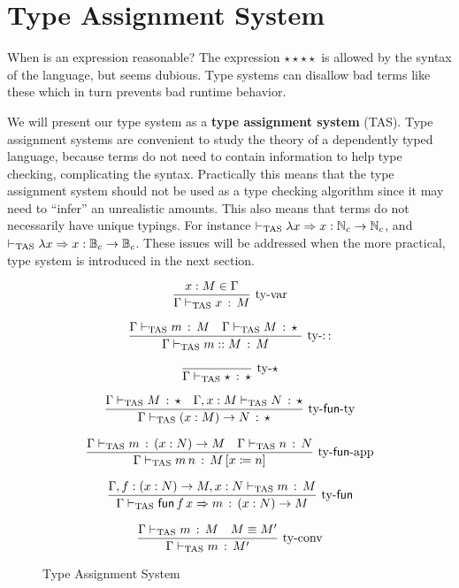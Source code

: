 \section{\SLang{} Type Assignment System}
 
When is an expression reasonable? The expression $\star\star\star\star$ is allowed by the syntax of the language, but seems dubious.
Type systems can disallow bad terms like these which in turn prevents bad runtime behavior.
 
We will present our type system as a \textbf{type assignment system} (\ac{TAS}).
Type assignment systems are convenient to study the theory of a dependently typed language, because terms do not need to contain information to help type checking, complicating the syntax. %
Practically this means that the type assignment system should not be used as a type checking algorithm since it may need to ``infer'' an unrealistic amounts.
This also means that terms do not necessarily have unique typings.
For instance $\vdash_{\mathrm{TAS}}\lambda x\Rightarrow x:\mathbb{N}_{c}\rightarrow\mathbb{N}_{c}$, and $\vdash_{\mathrm{TAS}}\lambda x\Rightarrow x:\mathbb{B}_{c}\rightarrow\mathbb{B}_{c}$.
These issues will be addressed when the more practical, \bidir{} type system is introduced in the next section.
 
\begin{figure}
\[
\frac{x:M\in\Gamma}{\Gamma\vdash_{\mathrm{TAS}} x\,:\,M}\,\operatorname{ty-var}
\]
 
\[
\frac{\Gamma\vdash_{\mathrm{TAS}} m\,:\,M \quad \Gamma\vdash_{\mathrm{TAS}} M\,:\,\star\
}{\Gamma\vdash_{\mathrm{TAS}} m::M\,:\,M}
\,\operatorname{ty-::}
\]
 
\[
\frac{{\color{gray}\ }}{\Gamma\tasys\star\,:\,\star}\,\rulename{ty-\star}
\]
 
\[
\frac{\Gamma\vdash_{\mathrm{TAS}} M\,:\,\star\quad\Gamma,x:M\vdash_{\mathrm{TAS}} N\,:\,\star}{\Gamma\vdash_{\mathrm{TAS}}\left(x:M\right)\rightarrow N\,:\,\star}\,\operatorname{ty-\mathsf{fun}-ty}
\]
 
\[
\frac{\Gamma\vdash_{\mathrm{TAS}} m\,:\,\left(x:N\right)\rightarrow M\quad\Gamma\vdash_{\mathrm{TAS}} n\,:\,N}{\Gamma\vdash_{\mathrm{TAS}} m\,n\,:\,M\left[x\coloneqq n\right]}\,\operatorname{ty-\mathsf{fun}-app}
\]
 
\[
\frac{\Gamma,f:\left(x:N\right)\rightarrow M,x:N\vdash_{\mathrm{TAS}} m\,:\,M}{\Gamma\vdash_{\mathrm{TAS}}\mathsf{fun}\,f\,x\Rightarrow m\,:\,\left(x:N\right)\rightarrow M}\,\operatorname{ty-\mathsf{fun}}
\]
 
\[
\frac{\Gamma\vdash_{\mathrm{TAS}} m\,:\,M\quad M\equiv M'}{\Gamma\vdash_{\mathrm{TAS}} m\,:\,M'}\,\operatorname{ty-conv}
\]
 
\caption{\SLang{} Type Assignment System}
\label{fig:surface-TAS}
\end{figure}
 
